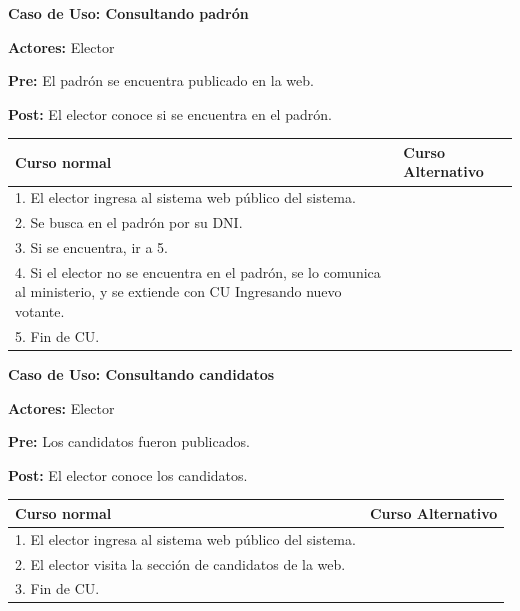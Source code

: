 \textbf{Caso de Uso:  Consultando padrón}

\textbf{Actores:} Elector 

\textbf{Pre:} El padrón se encuentra publicado en la web. 

\textbf{Post:}  El elector conoce si se encuentra en el padrón.

\begin{table}[h!]
	
 \begin{tabular}{|p{7.5cm} | p{7.5cm}|} 
 \hline
 \textbf{Curso normal} & \textbf{Curso Alternativo} \\
 \hline

1. El elector ingresa al sistema web público del sistema. & \\
 \hline



2. Se busca en el padrón por su DNI. & \\
 \hline



3. Si se encuentra, ir a 5. & \\
 \hline



4. Si el elector no se encuentra en el padrón, se lo comunica al ministerio, y se extiende con CU Ingresando nuevo votante. & \\
 \hline



5. Fin de CU. & \\
 \hline


 \end{tabular}

\end{table}




\textbf{Caso de Uso: Consultando candidatos}

\textbf{Actores:} Elector 

\textbf{Pre:} Los candidatos fueron publicados.

\textbf{Post:}  El elector conoce los candidatos.
\begin{table}[h!]
	
 \begin{tabular}{|p{7.5cm} | p{7.5cm}|} 
 \hline
 \textbf{Curso normal} & \textbf{Curso Alternativo} \\
 \hline
 
1. El elector ingresa al sistema web público del sistema. & \\
 \hline



2. El elector visita la sección de candidatos de la web. & \\
 \hline


3. Fin de CU. & \\
 \hline


 \end{tabular}

\end{table}


